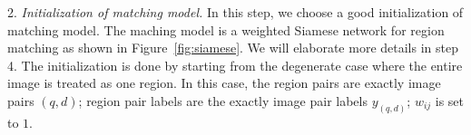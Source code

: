2. \emph{Initialization of matching model.}
In this step, we choose a good initialization of matching model. 
The maching model is a weighted Siamese network for region matching as shown in Figure~\ref{fig:siamese}. 
We will elaborate more details in step 4. 
The initialization is done by starting from the degenerate case where the entire image is treated as one region. 
In this case, the region pairs are exactly image pairs $(q, d)$; region pair labels are the exactly image pair labels $y_{(q, d)}$; $w_{ij}$ is set to $1$.


